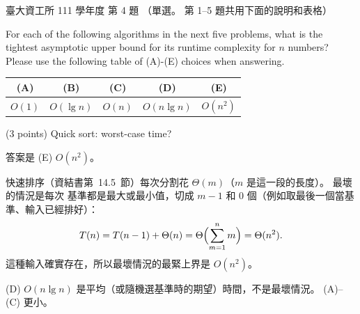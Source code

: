 \begin{pastexam}[label={px:ntu-111-dsaa-04}]{臺大資工所 111 學年度 第 4 題}
（單選。 第 1--5 題共用下面的說明和表格）

For each of the following algorithms in the next five problems, what is the tightest asymptotic
upper bound for its runtime complexity for $n$ numbers? Please use the following table of (A)-(E)
choices when answering.
\begin{center}
\begin{tabular}{c|c|c|c|c}
(A) & (B) & (C) & (D) & (E) \\ \hline
$O(1)$ & $O(\lg n)$ & $O(n)$ & $O(n\lg n)$ & $O(n^2)$
\end{tabular}
\end{center}

(3 points) Quick sort: worst-case time?
\end{pastexam}

\begin{pastsoln}
答案是 (E) $O(n^2)$。

快速排序（資結書第~14.5~節）每次分割花 $\Theta(m)$（$m$ 是這一段的長度）。 最壞的情況是每次
基準都是最大或最小值，切成 $m - 1$ 和 $0$ 個（例如取最後一個當基準、輸入已經排好）：
\[
T(n) = T(n - 1) + \Theta(n) = \Theta\Bigl(\sum_{m=1}^{n} m\Bigr) = \Theta(n^2).
\]
這種輸入確實存在，所以最壞情況的最緊上界是 $O(n^2)$。

(D) $O(n \lg n)$ 是平均（或隨機選基準時的期望）時間，不是最壞情況。 (A)--(C) 更小。
\end{pastsoln}
